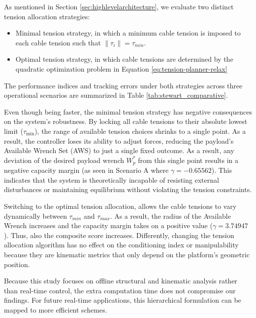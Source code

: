 As mentioned in Section \ref{sec:highlevelarchitecture}, we evaluate two distinct tension allocation strategies:
\begin{itemize}
    \item Minimal tension strategy, in which a minimum cable tension is imposed to each cable tension such that $\|\tau_i \| = \tau_{min}$.
    \item Optimal tension strategy, in which cable tensions are determined by the quadratic optimization problem in Equation \ref{eq:tension-planner-relax}
\end{itemize}

The performance indices and tracking errors under both strategies across three operational scenarios are summarized in Table \ref{tab:stewart_comparative}.

Even though being faster, the minimal tension strategy has negative consequences on the system's robustness. By locking all cable tensions to their absolute lowest limit ($\tau_{\min}$), the range of available tension choices shrinks to a single point. As a result, the controller loses its ability to adjust forces, reducing the payload's Available Wrench Set (AWS) to just a single fixed outcome. \cite{yang_robust_2025}
As a result, any deviation of the desired payload wrench $W_p^*$ from this single point results in a negative capacity margin (as seen in Scenario A where $\gamma = -0.65562$). This indicates that the system is theoretically incapable of resisting external disturbances or maintaining equilibrium without violating the tension constraints.

Switching to the optimal tension allocation, allows the cable tensions to vary dynamically between $\tau_{min}$ and $\tau_{max}$. As a result, the radius of the Available Wrench increases and the capacity margin takes on a positive value ($\gamma = 3.74947$). Thus, also the composite score increases. Differently, changing the tension allocation algorithm has no effect on the conditioning index or manipulability because they are kinematic metrics that only depend on the platform's geometric position.

Because this study focuses on offline structural and kinematic analysis rather than real-time control, the extra computation time does not compromise our findings. For future real-time applications, this hierarchical formulation can be mapped to more efficient schemes.


